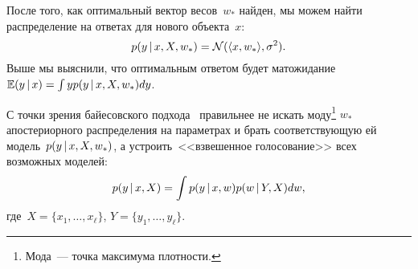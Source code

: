 \documentclass[12pt,fleqn]{article}
\begin{document}
После того, как оптимальный вектор весов~$w_*$ найден,
мы можем найти распределение на ответах для нового объекта~$x$:
\[
    p(y \mspace{3mu}{|}\mspace{3mu} x, X, w_*)
    =
    \mathcal{N} (\langle x, w_* \rangle, \sigma^2).
\]
Выше мы выяснили, что оптимальным ответом будет
матожидание~$\mathbb{E} (y \mspace{3mu}{|}\mspace{3mu} x) = \int y p(y \mspace{3mu}{|}\mspace{3mu} x, X, w_*) dy$.

С точки зрения байесовского подхода~\cite{murphy12probabilistic}
правильнее не искать моду\footnote{
    Мода~--- точка максимума плотности.
} $w_*$ апостериорного распределения на параметрах и брать соответствующую
ей модель~$p(y \mspace{3mu}{|}\mspace{3mu} x, X, w_*)$,
а устроить~<<взвешенное голосование>> всех возможных моделей:
\[
    p(y \mspace{3mu}{|}\mspace{3mu} x, X)
    =
    \int p(y \mspace{3mu}{|}\mspace{3mu} x, w) p(w \mspace{3mu}{|}\mspace{3mu} Y, X) dw,
\]
где~$X = \{x_1, \dots, x_\ell\}$, $Y = \{y_1, \dots, y_\ell\}$.



\end{document}
